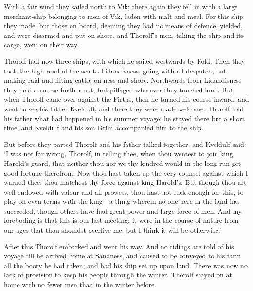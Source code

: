 With a fair wind they sailed north to Vik; there again they fell in with a large merchant-ship belonging to men of Vik, laden with malt and meal. For this ship they made; but those on board, deeming they had no means of defence, yielded, and were disarmed and put on shore, and Thorolf's men, taking the ship and its cargo, went on their way.

Thorolf had now three ships, with which he sailed westwards by Fold. Then they took the high road of the sea to Lidandisness, going with all despatch, but making raid and lifting cattle on ness and shore. Northwards from Lidandisness they held a course further out, but pillaged wherever they touched land. But when Thorolf came over against the Firths, then he turned his course inward, and went to see his father Kveldulf, and there they were made welcome. Thorolf told his father what had happened in his summer voyage; he stayed there but a short time, and Kveldulf and his son Grim accompanied him to the ship.

But before they parted Thorolf and his father talked together, and Kveldulf said: `I was not far wrong, Thorolf, in telling thee, when thou wentest to join king Harold's guard, that neither thou nor we thy kindred would in the long run get good-fortune therefrom. Now thou hast taken up the very counsel against which I warned thee; thou matchest thy force against king Harold's. But though thou art well endowed with valour and all prowess, thou hast not luck enough for this, to play on even terms with the king - a thing wherein no one here in the land has succeeded, though others have had great power and large force of men. And my foreboding is that this is our last meeting: it were in the course of nature from our ages that thou shouldst overlive me, but I think it will be otherwise.'

After this Thorolf embarked and went his way. And no tidings are told of his voyage till he arrived home at Sandness, and caused to be conveyed to his farm all the booty he had taken, and had his ship set up upon land. There was now no lack of provision to keep his people through the winter. Thorolf stayed on at home with no fewer men than in the winter before.
